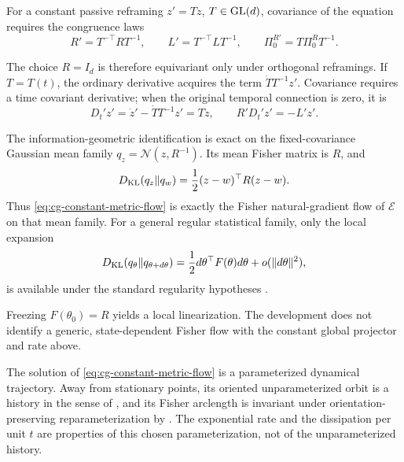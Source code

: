 For a constant passive reframing \(z'=Tz\), \(T\in\mathrm{GL}(d)\), covariance of
the equation requires the congruence laws
\begin{equation}
R'=T^{-\top}RT^{-1},\qquad
L'=T^{-\top}LT^{-1},\qquad
\Pi_0^{R'}=T\Pi_0^RT^{-1}.
\label{eq:cg-flow-congruence}
\end{equation}

The choice \(R=I_d\) is therefore equivariant only
under orthogonal reframings. If \(T=T(t)\), the ordinary derivative acquires
the term \(\dot TT^{-1}z'\). Covariance requires a time covariant derivative;
when the original temporal connection is zero, it is
\begin{equation}
D_t'z'=\dot z'-\dot TT^{-1}z'=T\dot z,
\qquad R'D_t'z'=-L'z'.
\label{eq:cg-time-covariant-flow}
\end{equation}

The information-geometric identification is exact on the fixed-covariance
Gaussian mean family
\(q_z=\mathcal N(z,R^{-1})\). Its mean Fisher matrix is \(R\), and
\begin{equation}
D_{\mathrm{KL}}(q_z\Vert q_w)
=\frac12(z-w)^\top R(z-w).
\label{eq:cg-fixed-covariance-kl}
\end{equation}
Thus \eqref{eq:cg-constant-metric-flow} is exactly the Fisher natural-gradient
flow of \(\mathcal E\) on that mean family. For a general regular statistical
family, only the local expansion
\begin{equation}
D_{\mathrm{KL}}(q_\theta\Vert q_{\theta+d\theta})
=\frac12d\theta^\top F(\theta)d\theta
+o(\|d\theta\|^2),
\label{eq:cg-local-fisher-kl}
\end{equation}
is available under the standard regularity hypotheses
\citep{AmariNagaoka2000}. 

Freezing
\(F(\theta_0)=R\) yields a local linearization. The development does not
identify a generic, state-dependent Fisher flow with the constant global
projector and rate above. 

The solution of \eqref{eq:cg-constant-metric-flow} is a parameterized
dynamical trajectory.  Away from stationary points, its oriented
unparameterized orbit is a history in the sense of
, and its Fisher arclength is invariant under
orientation-preserving reparameterization by
. The exponential rate and the
dissipation per unit \(t\) are properties of this chosen parameterization, not
of the unparameterized history. 

